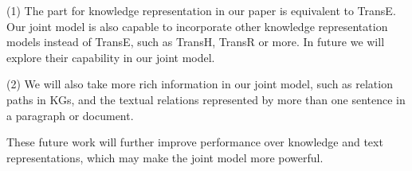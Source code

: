 \documentclass[11pt,a4paper]{article}
\begin{document}
(1) The part for knowledge representation in our paper is equivalent to TransE. Our joint model is also capable to incorporate other knowledge representation models instead of TransE, such as TransH, TransR or more. In future we will explore their capability in our joint model. 

(2) We will also take more rich information in our joint model, such as relation paths in KGs, and the textual relations represented by more than one sentence in a paragraph or document.

These future work will further improve performance over knowledge and text representations, which may make the joint model more powerful.



\end{document}
